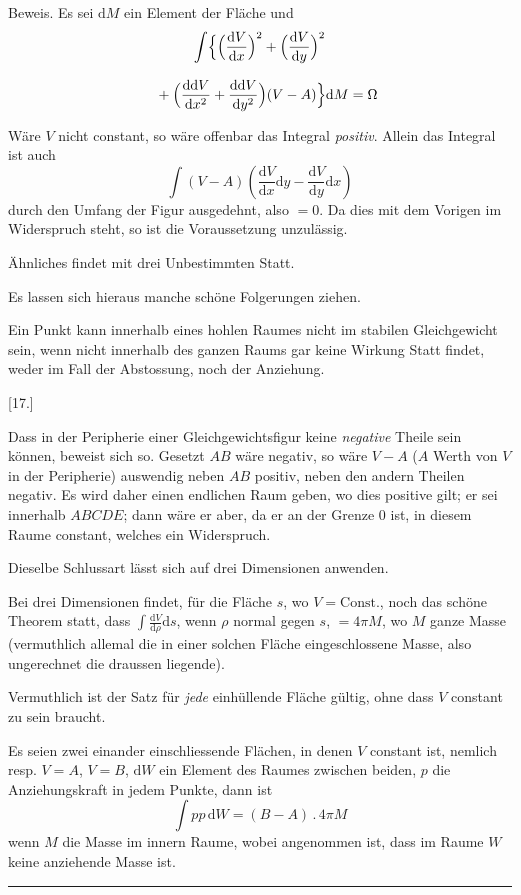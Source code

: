 Beweis. Es sei $\mathrm{d}M$ ein Element der Fläche und
\[
\begin{gathered}\int\Bigl\{
\Bigl(\frac{\mathrm{d}V}{\mathrm{d}x}\Bigr)^2
+\Bigl(\frac{\mathrm{d}V}{\mathrm{d}y}\Bigr)^2
\\[8pt]\quad{}+\Bigl(\frac{\mathrm{dd}V}{\mathrm{d}x^2}
+\frac{\mathrm{dd}V}{\mathrm{d}y^2}\Bigr)(V-A)
\Bigr\}\mathrm{d}M=\Omega\end{gathered}
\]


Wäre $V$ nicht constant, so wäre offenbar das Integral \emph{positiv}. Allein das Integral ist auch
\[
\int(V-A)\left(\frac{\mathrm{d}V}{\mathrm{d}x}\mathrm{d}y
-\frac{\mathrm{d}V}{\mathrm{d}y}\mathrm{d}x\right)
\]
durch den Umfang der Figur ausgedehnt, also $=0$. Da dies mit dem Vorigen
im Widerspruch steht, so ist die Voraussetzung unzulässig.

Ähnliches findet mit drei Unbestimmten Statt.

Es lassen sich hieraus manche schöne Folgerungen ziehen.

Ein Punkt kann innerhalb eines hohlen Raumes nicht im stabilen Gleichgewicht sein, wenn nicht innerhalb des ganzen Raums gar keine Wirkung Statt
findet, weder im Fall der Abstossung, noch der Anziehung.

\par\medskip{}\centerline{[17.]}\nobreak\smallskip
Dass in der Peripherie einer Gleichgewichtsfigur keine \emph{negative} Theile sein
können, beweist sich so. Gesetzt $AB$ wäre negativ, so wäre $V-A$ ($A$ Werth
von $V$ in der Peripherie) auswendig neben $AB$ positiv, neben den andern Theilen negativ. Es wird daher einen endlichen Raum geben, wo dies positive gilt;
er sei innerhalb $ABCDE$; dann wäre er aber, da er an der Grenze $0$ ist, in
diesem Raume constant, welches ein Widerspruch.

Dieselbe Schlussart lässt sich auf drei Dimensionen anwenden.

Bei drei Dimensionen findet, für die Fläche $s$, wo $V=\mathrm{Const.}$, noch das
schöne Theorem statt, dass $\int\frac{\mathrm{d}V}{\mathrm{d}\rho}\mathrm{d}s$,
wenn $\rho$ normal gegen $s$, $=4\pi M$, wo $M$
ganze Masse (vermuthlich allemal die in einer solchen Fläche eingeschlossene
Masse, also ungerechnet die draussen liegende).

Vermuthlich ist der Satz für \emph{jede} einhüllende Fläche gültig, ohne dass $V$
constant zu sein braucht.

Es seien zwei einander einschliessende Flächen, in denen $V$ constant ist,
nemlich resp. $V=A$, $V=B$, $\mathrm{d}W$ ein Element des Raumes zwischen beiden,
$p$ die Anziehungskraft in jedem Punkte, dann ist
\[
\int pp\,\mathrm{d}W=(B-A)\, .\,4\pi M
\]
wenn $M$ die Masse im innern Raume, wobei angenommen ist, dass im Raume
$W$ keine anziehende Masse ist.

\par\nopagebreak\begin{center}\rule{93.96bp}{0.35pt}\end{center}

